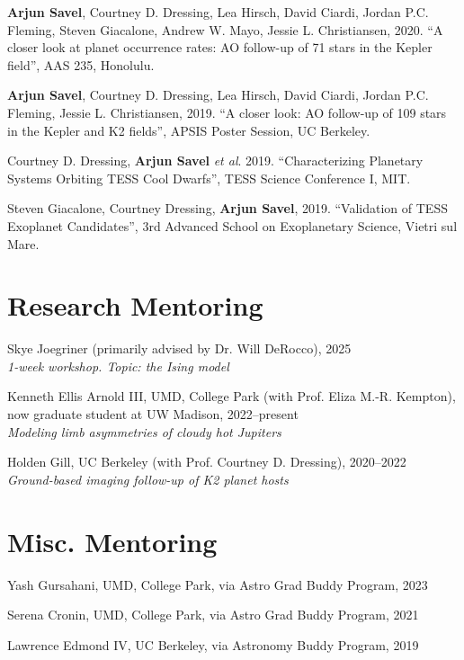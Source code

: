 \documentclass[letterpaper,10.5pt]{article}
\newcommand{\resumeSubHeadingListStart}{\begin{itemize}[leftmargin=*]}
\newcommand{\shorterSection}[1]{\vspace{-10pt}\section{#1}}
\begin{document}
\begin{list}{}{\cvlist}
  \item[{\color{numcolor}\scriptsize4}]\textbf{Arjun Savel}, Courtney D. Dressing, Lea Hirsch, David Ciardi, Jordan P.C. Fleming, Steven Giacalone, Andrew W. Mayo, Jessie L. Christiansen, 2020. “A closer look at planet occurrence rates: AO follow-up of 71 stars in the Kepler field”, AAS 235, Honolulu.

  \item[{\color{numcolor}\scriptsize3}] \textbf{Arjun Savel}, Courtney D. Dressing, Lea Hirsch, David Ciardi, Jordan P.C. Fleming, Jessie L. Christiansen, 2019. “A closer look: AO follow-up of 109 stars in the Kepler and K2 fields”, APSIS Poster Session, UC Berkeley.

\item[{\color{numcolor}\scriptsize2}] Courtney D. Dressing, \textbf{Arjun Savel} \textit{et al}. 2019. “Characterizing Planetary Systems Orbiting TESS Cool Dwarfs”, TESS Science Conference I, MIT.

\item[{\color{numcolor}\scriptsize1}] Steven Giacalone, Courtney Dressing, \textbf{Arjun Savel}, 2019. “Validation of TESS Exoplanet Candidates”, 3rd Advanced School on Exoplanetary Science, Vietri sul Mare.

  \end{list}

\shorterSection{Research Mentoring}
\small
  \begin{list}{}{\cvlist}  

  \item[{\color{numcolor}}]Skye Joegriner (primarily advised by Dr. Will DeRocco), 2025 \\
    \textit{1-week workshop. Topic: the Ising model}
  \item[{\color{numcolor}}]Kenneth Ellis Arnold III, UMD, College Park (with Prof. Eliza M.-R. Kempton), now graduate student at UW Madison, 2022--present \\
  \textit{Modeling limb asymmetries of cloudy hot Jupiters}
  \item[{\color{numcolor}}]Holden Gill, UC Berkeley (with Prof. Courtney D. Dressing), 2020--2022 \\
    \textit{Ground-based imaging follow-up of K2 planet hosts}


  \end{list}

\shorterSection{Misc. Mentoring}
\small
  \begin{list}{}{\cvlist}
  \item[{\color{numcolor}}]Yash Gursahani, UMD, College Park, via Astro Grad Buddy Program, 2023
  \item[{\color{numcolor}}]Serena Cronin, UMD, College Park, via Astro Grad Buddy Program, 2021 
  \item[{\color{numcolor}}]Lawrence Edmond IV, UC Berkeley, via Astronomy Buddy Program, 2019


  \end{list} 
\end{document}
